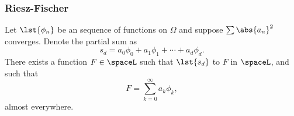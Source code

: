 \documentclass[handout]{beamer}
\begin{document}
\begin{frame}      %
\frametitle{Riesz-Fischer}
   \begin{theorem}
Let $\lst{\phi_{n}}$ be an  sequence of functions on $\Omega$ and suppose $\sum \abs{a_{n}}^{2}$ converges. Denote the partial sum as
  \begin{equation*}
    s_{d} = a_{0}\phi_{0} + a_{1}\phi_{1} + \cdots + a_{d}\phi_{d} .
  \end{equation*}
There exists a function $F\in\spaceL$ such that $\lst{s_{d}}$  to $F$ in $\spaceL$, and such that
  \begin{equation*}
    F = \sum_{k=0}^{\infty} a_{k}\phi_{k},
  \end{equation*}
almost everywhere.
\end{theorem}
\end{frame}
\end{document}
